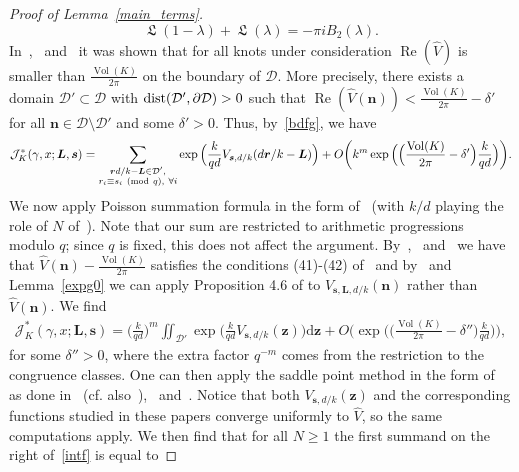 \documentclass[11pt]{amsart}
\newcommand{\br}{{\boldsymbol r}}
\newcommand{\J}{\mathcal{J}}
\newcommand{\tn}[1]{\textnormal{#1}}
\renewcommand{\mod}[1]{~\pr{\textnormal{mod}~#1}}
\theoremstyle{definition}
\newcommand{\ssum}[1]{\sum_{\substack{#1}}}
\newcommand{\pr}[1]{\mathchoice{\left( #1\right)}{(#1)}{(#1)}{(#1)}}
\newcommand{\df}{\mathrm{d}}
\DeclareMathOperator{\Lie}{{\mathfrak L}}
\DeclareMathOperator{\Vol}{Vol}
\newcommand{\bs}{\boldsymbol }
\renewcommand\Re{\operatorname{Re}}
\newcommand{\1}{{\mathbf 1}}
\let\originalleft\left
\let\originalright\right
\renewcommand{\left}{\mathopen{}\mathclose\bgroup\originalleft}
\renewcommand{\right}{\aftergroup\egroup\originalright}
\numberwithin{equation}{section}
\begin{document}
\begin{proof}[Proof of Lemma~\ref{main_terms}]
  $$
  \Lie(1-\lambda)+\Lie(\lambda)=-\pi i B_2(\lambda).
  $$
  In~\cite[Lemma 2.1]{Ohtsuki52},~\cite[\S3.2, \S4.2, \S5.2]{OhtsukiYokota6} and~\cite[\S3.2, \S4.2, \S5.2, \S6.2, \S7.2]{Ohtsuki7} it was shown that for all knots under consideration $\Re (\hat V)$ is smaller than $\frac{\Vol(K)}{2\pi}$ on the boundary of $\mathcal D$. More precisely, there exists a domain $\mathcal D'\subset\mathcal D$ with $\tn{dist}(\mathcal D',\partial \mathcal D)>0$ such that $\Re(\hat V(\bs n))<\frac{\Vol(K)}{2\pi}-\delta'$ for all $\bs n\in \mathcal{D}\setminus\mathcal D'$ and some $\delta'>0$. Thus, by~\eqref{bdfg}, we have
  \begin{align*}
    \J^{*}_K(\gamma, x;\boldsymbol L,\boldsymbol s) =   \ssum{ \br d/k-\bs L\in \mathcal  D',\\  r_i\equiv s_i \mod{q},\ \forall i}
    \exp\Big(\frac{k}{qd}  V_{\bs s,d/k}(d\br/k -\bs L )\Big)+O\bigg(k^m\exp\Big(\Big(\frac{\Vol(K)}{2\pi}-\delta'\Big)\frac{k}{qd}\Big)\bigg).
  \end{align*}
  We now apply Poisson summation formula in the form of~\cite[Proposition 4.6]{Ohtsuki52} (with $k/d$ playing the role of $N$ of~\cite{Ohtsuki52}). Note that our sum are restricted to arithmetic progressions modulo $q$; since $q$ is fixed, this does not affect the argument.
  By~\cite[Lemma 5.1]{Ohtsuki52},~\cite[Lemma 3.4, 4.3 and 5.2]{OhtsukiYokota6} and~\cite[Lemma 3.2, 4.2, 5.2, 6.2 and 7.2]{Ohtsuki7} we have that
  $\hat V(\bs n)-\frac{\Vol(K)}{2\pi }$ satisfies the conditions (41)-(42) of~\cite[Proposition 4.6]{Ohtsuki52} and by~\cite[Remark 4.8]{Ohtsuki52} and Lemma~\ref{expg0} we can apply Proposition 4.6 of \cite{Ohtsuki52} to $ V_{\bs s,\bs L,d/k}(\bs n)$ rather than $\hat V(\bs n)$. We find
  \begin{align}\label{intf}
    \J^{*}_K(\gamma, x; \boldsymbol L,\boldsymbol s) = \Big(\frac k{qd}\Big)^m   \iint_{\mathcal D'}
    \exp\Big(\frac{k}{qd}  V_{\bs s,d/k}(\bs z)\Big)\df \bs z+O\bigg(\exp\Big(\Big(\frac{\Vol(K)}{2\pi}-\delta''\Big)\frac{k}{qd}\Big)\bigg),
  \end{align}
  for some $\delta''>0$, where the extra factor $q^{-m}$ comes from the restriction to the congruence classes.
  One can then apply the saddle point method in the form of~\cite[Proposition~3.5 and Remark~3.6]{Ohtsuki52} as done in~\cite[p.705-706 and \S5.2]{Ohtsuki52} (cf. also~\cite{Yokota2011}),~\cite[p.297 and \S3.5; p.309 and \S4.5; p.47 and \S5.5]{OhtsukiYokota6} and~\cite[p.13 and \S3.5; p.26 and \S4.5; p.39 and \S5.5; p.50 and \S6.5; p.64 and \S7.5]{Ohtsuki7}. Notice that both $ V_{\bs s,d/k}(\bs z)$ and the corresponding functions studied in these papers converge uniformly to $\hat V$, so the same computations apply. We then find that for all $N\geq1$ the first summand on the right of~\eqref{intf} is equal to

\end{proof}
\end{document}
